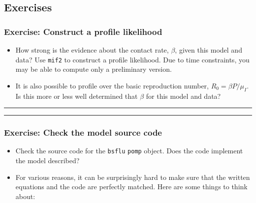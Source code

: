 \documentclass[]{article}
\begin{document}
\subsection{Exercises}\label{exercises}

\subsubsection{Exercise: Construct a profile
likelihood}\label{exercise-construct-a-profile-likelihood}

\begin{itemize}
\item
  How strong is the evidence about the contact rate, \(\beta\), given
  this model and data? Use \texttt{mif2} to construct a profile
  likelihood. Due to time constraints, you may be able to compute only a
  preliminary version.
\item
  It is also possible to profile over the basic reproduction number,
  \(R_0=\beta P/\mu_I\). Is this more or less well determined that
  \(\beta\) for this model and data?
\end{itemize}

\begin{center}\rule{0.5\linewidth}{\linethickness}\end{center}

\begin{center}\rule{0.5\linewidth}{\linethickness}\end{center}

\subsubsection{Exercise: Check the model source
code}\label{exercise-check-the-model-source-code}

\begin{itemize}
\item
  Check the source code for the \texttt{bsflu} \texttt{pomp} object.
  Does the code implement the model described?
\item
  For various reasons, it can be surprisingly hard to make sure that the
  written equations and the code are perfectly matched. Here are some
  things to think about:
\end{itemize}
\end{document}
